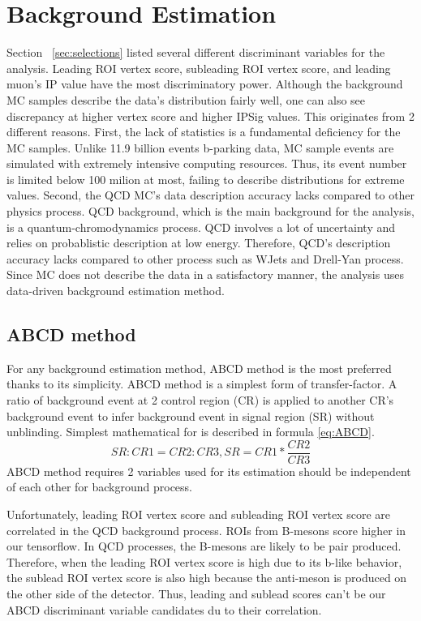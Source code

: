 \clearpage
\chapter{Background Estimation}\label{sec:estimate}

Section ~\ref{sec:selections} listed several different discriminant variables for the analysis.
Leading ROI vertex score, subleading ROI vertex score, and leading muon's IP value have the most discriminatory power.
Although the background MC samples describe the data's distribution fairly well, one can also see discrepancy at higher vertex score and higher IPSig values.
This originates from 2 different reasons.
First, the lack of statistics is a fundamental deficiency for the MC samples.
Unlike 11.9 billion events b-parking data, MC sample events are simulated with extremely intensive computing resources.
Thus, its event number is limited below 100 milion at most, failing to describe distributions for extreme values.
Second, the QCD MC's data description accuracy lacks compared to other physics process.
QCD background, which is the main background for the analysis, is a quantum-chromodynamics process.
QCD involves a lot of uncertainty and relies on probablistic description at low energy.
Therefore, QCD's description accuracy lacks compared to other process such as WJets and Drell-Yan process.
Since MC does not describe the data in a satisfactory manner, the analysis uses data-driven background estimation method.


\section{ABCD method}
For any background estimation method, ABCD method is the most preferred thanks to its simplicity.
ABCD method is a simplest form of transfer-factor.
A ratio of background event at 2 control region (CR) is applied to another CR's background event to infer background event in signal region (SR) without unblinding.
Simplest mathematical for is described in formula \ref{eq:ABCD}.
\begin{equation}
\label{eq:ABCD}
	SR:CR1=CR2:CR3, SR=CR1*\frac{CR2}{CR3} 
\end{equation}
ABCD method requires 2 variables used for its estimation should be independent of each other for background process.


Unfortunately, leading ROI vertex score and subleading ROI vertex score are correlated in the QCD background process.
ROIs from B-mesons score higher in our tensorflow.
In QCD processes, the B-mesons are likely to be pair produced.
Therefore, when the leading ROI vertex score is high due to its b-like behavior, the sublead ROI vertex score is also high because the anti-meson is produced on the other side of the detector.
Thus, leading and sublead scores can't be our ABCD discriminant variable candidates du to their correlation.

